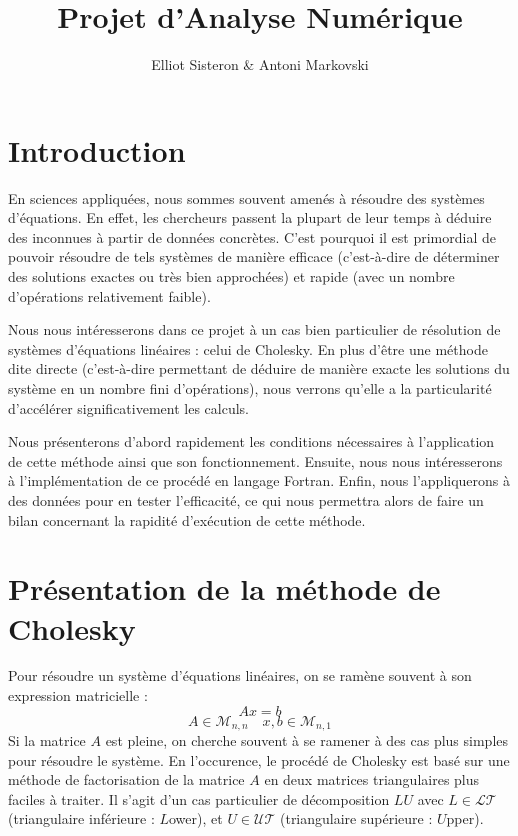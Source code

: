 \documentclass[a4paper, titlepage]{livret}													%
\title{Projet d'Analyse Numérique}															%
\author{Elliot Sisteron & Antoni Markovski}													%
\begin{document}

\setcounter{tocdepth}{2}
\tableofcontents																			%

\chapter*{Introduction}
	En sciences appliquées, nous sommes souvent amenés à résoudre des systèmes d'équations.
	En effet, les chercheurs passent la plupart de leur temps à déduire des \og inconnues \fg{} à partir de données concrètes.
	C'est pourquoi il est primordial de pouvoir résoudre de tels systèmes de manière efficace (c'est-à-dire de déterminer des solutions exactes ou très bien approchées) et rapide (avec un nombre d'opérations relativement faible).

	Nous nous intéresserons dans ce projet à un cas bien particulier de résolution de systèmes d'équations linéaires : celui de Cholesky.
	En plus d'être une méthode dite \og directe \fg{} (c'est-à-dire permettant de déduire de manière exacte les solutions du système en un nombre fini d'opérations), nous verrons qu'elle a la particularité d'accélérer significativement les calculs.

	Nous présenterons d'abord rapidement les conditions nécessaires à l'application de cette méthode ainsi que son fonctionnement.
	Ensuite, nous nous intéresserons à l'implémentation de ce procédé en langage Fortran.
	Enfin, nous l'appliquerons à des données pour en tester l'efficacité, ce qui nous permettra alors de faire un bilan concernant la rapidité d'exécution de cette méthode.

\chapter{Présentation de la méthode de Cholesky}
	Pour résoudre un système d'équations linéaires, on se ramène souvent à son expression matricielle : 
		\[ Ax = b \]
		\[ A \in \mathcal{M}_{n,n} \quad x, b \in \mathcal{M}_{n,1} \]
	Si la matrice $A$ est pleine, on cherche souvent à se ramener à des cas plus simples pour résoudre le système.
	En l'occurence, le procédé de Cholesky est basé sur une méthode de factorisation de la matrice $A$ en deux matrices triangulaires plus faciles à traiter.
	Il s'agit d'un cas particulier de décomposition $LU$ avec $L \in \mathcal{LT}$ (triangulaire inférieure : $L$ower), et $U \in \mathcal{UT}$ (triangulaire supérieure : $U$pper).
	
\end{document}
